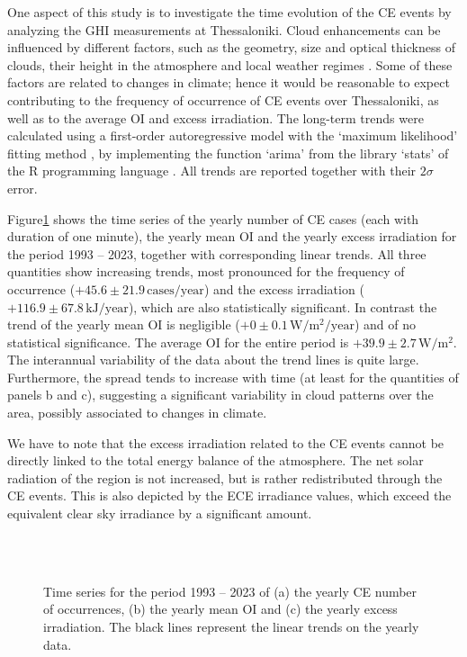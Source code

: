 \documentclass[preprint, 5p,
authoryear]{elsarticle} %
\begin{document}
One aspect of this study is to investigate the time evolution of the CE
events by analyzing the GHI measurements at Thessaloniki. Cloud
enhancements can be influenced by different factors, such as the
geometry, size and optical thickness of clouds, their height in the
atmosphere and local weather regimes
\citep{Mol2023, Veerman2022, Gristey2022, Tzoumanikas2016}. Some of
these factors are related to changes in climate; hence it would be
reasonable to expect contributing to the frequency of occurrence of CE
events over Thessaloniki, as well as to the average OI and excess
irradiation. The long-term trends were calculated using a first-order
autoregressive model with the `maximum likelihood' fitting method
\citep{Gardner1980, Jones1980}, by implementing the function `arima'
from the library `stats' of the R programming language \citep{RCT2023}.
All trends are reported together with their \(2\sigma\) error.

Figure\nobreakspace{}\ref{fig:P-energy} shows the time series of the
yearly number of CE cases (each with duration of one minute), the yearly
mean OI and the yearly excess irradiation for the period 1993 -- 2023,
together with corresponding linear trends. All three quantities show
increasing trends, most pronounced for the frequency of occurrence
(\(+45.6\pm 21.9\,\text{cases}/\text{year}\)) and the excess irradiation
(\(+116.9 \pm 67.8\,\text{kJ}/\text{year}\)), which are also
statistically significant. In contrast the trend of the yearly mean OI
is negligible (\(+0\pm 0.1\,\text{W}/\text{m}^2/\text{year}\)) and of no
statistical significance. The average OI for the entire period is
\(+39.9\pm 2.7\,\text{W}/\text{m}^2\). The interannual variability of
the data about the trend lines is quite large. Furthermore, the spread
tends to increase with time (at least for the quantities of panels b and
c), suggesting a significant variability in cloud patterns over the
area, possibly associated to changes in climate.

We have to note that the excess irradiation related to the CE events
cannot be directly linked to the total energy balance of the atmosphere.
The net solar radiation of the region is not increased, but is rather
redistributed through the CE events. This is also depicted by the ECE
irradiance values, which exceed the equivalent clear sky irradiance by a
significant amount.

\begin{figure}%
        {\centering 
            \\
            \\
        }
    \caption{Time series for the period 1993 -- 2023 of (a) the yearly CE number of occurrences, (b) the yearly mean OI and (c) the yearly excess irradiation. The black lines represent the linear trends on the yearly data.}\label{fig:P-energy}
\end{figure}
\end{document}
